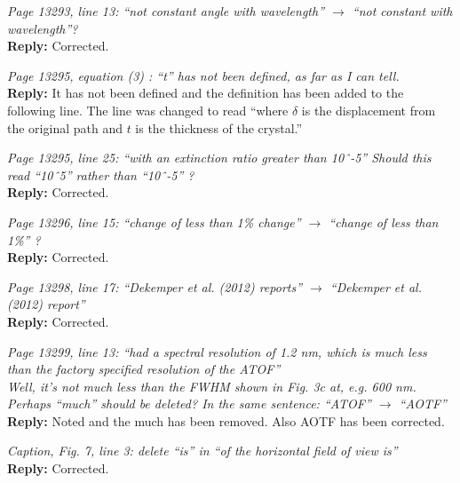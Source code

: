 \documentclass[12pt, notitlepage]{article}
\begin{document}
\textit{Page 13293, line 13: ``not constant angle with wavelength'' $\rightarrow$ ``not constant with wavelength''?}\\

\textbf{Reply:} Corrected.

\hrulefill

\textit{Page 13295, equation (3) : ``t'' has not been defined, as far as I can tell.}\\

\textbf{Reply:} It has not been defined and the definition has been added to the following line. The line was changed to read ``where $\delta$ is the displacement from the original path and $t$ is the thickness of the crystal.''

\hrulefill

\textit{Page 13295, line 25: ``with an extinction ratio greater than 10ˆ-5''
Should this read ``10ˆ5'' rather than ``10ˆ-5'' ?}\\

\textbf{Reply:} Corrected.

\hrulefill

\textit{Page 13296, line 15: ``change of less than 1\% change'' $\rightarrow$ ``change of less than 1\%'' ?}\\

\textbf{Reply:} Corrected.

\hrulefill

\textit{Page 13298, line 17: ``Dekemper et al. (2012) reports'' $\rightarrow$ ``Dekemper et al. (2012)
report''}\\

\textbf{Reply:} Corrected.

\hrulefill

\textit{Page 13299, line 13: ``had a spectral resolution of 1.2 nm, which is much less than the
factory specified resolution of the ATOF''}\\

\textit{Well, it's not much less than the FWHM shown in Fig. 3c at, e.g. 600 nm. Perhaps
``much'' should be deleted? In the same sentence: ``ATOF'' $\rightarrow$ ``AOTF''}\\

\textbf{Reply:} Noted and the much has been removed. Also AOTF has been corrected.

\hrulefill

\textit{Caption, Fig. 7, line 3: delete ``is'' in ``of the horizontal field of view is''}\\

\textbf{Reply:} Corrected.
\end{document}
